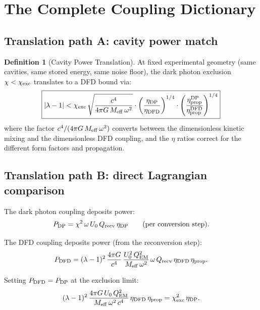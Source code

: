 \documentclass[11pt]{article}
\newcommand{\lam}{\lambda}
\newcommand{\lbone}{|\lambda - 1|}
\newcommand{\Meff}{M_{\rm eff}}
\newcommand{\QEM}{Q_{\rm EM}}
\theoremstyle{definition}
\newtheorem{definition}[theorem]{Definition}
\theoremstyle{remark}
\begin{document}
\section{The Complete Coupling Dictionary}
\label{sec:dictionary}

\subsection{Translation path A: cavity power match}

\begin{definition}[Cavity Power Translation]
\label{def:power_match}
At fixed experimental geometry (same cavities, same stored energy,
same noise floor), the dark photon exclusion $\chi < \chi_{\rm exc}$
translates to a DFD bound via:
\begin{equation}
\boxed{
\lbone < \chi_{\rm exc}\,\sqrt{\frac{c^4}{4\pi G\,\Meff\,\omega^2}}
\cdot\left(\frac{\eta_{\rm DP}}{\eta_{\rm DFD}}\right)^{1/4}
\cdot\left(\frac{\eta_{\rm prop}^{\rm DP}}{\eta_{\rm prop}^{\rm DFD}}
\right)^{1/4}
}
\label{eq:translation_A}
\end{equation}
where the factor $c^4/(4\pi G\,\Meff\,\omega^2)$ converts between
the dimensionless kinetic mixing and the dimensionless DFD coupling,
and the $\eta$ ratios correct for the different form factors and
propagation.
\end{definition}

\subsection{Translation path B: direct Lagrangian comparison}

The dark photon coupling deposits power:
\begin{equation}
P_{\rm DP} = \chi^2\,\omega\,U_0\,Q_{\rm recv}\,\eta_{\rm DP}
\qquad\text{(per conversion step)}.
\label{eq:P_DP_single}
\end{equation}

The DFD coupling deposits power (from the reconversion step):
\begin{equation}
P_{\rm DFD} = (\lam-1)^2\,\frac{4\pi G}{c^4}\,\frac{U_0^2\,\QEM^2}
{\Meff\,\omega^2}\,\omega\,Q_{\rm recv}\,\eta_{\rm DFD}\,\eta_{\rm prop}.
\label{eq:P_DFD_single}
\end{equation}

Setting $P_{\rm DFD} = P_{\rm DP}$ at the exclusion limit:
\begin{equation}
(\lam-1)^2\,\frac{4\pi G\,U_0\,\QEM^2}{\Meff\,\omega^2\,c^4}
\,\eta_{\rm DFD}\,\eta_{\rm prop}
= \chi_{\rm exc}^2\,\eta_{\rm DP}.
\label{eq:matching}
\end{equation}
\end{document}
